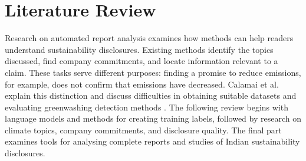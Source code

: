 \section{Literature Review}
\label{sec:literature}

Research on automated report analysis examines how methods can help readers understand sustainability disclosures. Existing methods identify the topics discussed, find company commitments, and locate information relevant to a claim. These tasks serve different purposes: finding a promise to reduce emissions, for example, does not confirm that emissions have decreased. Calamai et al. explain this distinction and discuss difficulties in obtaining suitable datasets and evaluating greenwashing detection methods \cite{calamai2025}. The following review begins with language models and methods for creating training labels, followed by research on climate topics, company commitments, and disclosure quality. The final part examines tools for analysing complete reports and studies of Indian sustainability disclosures.

